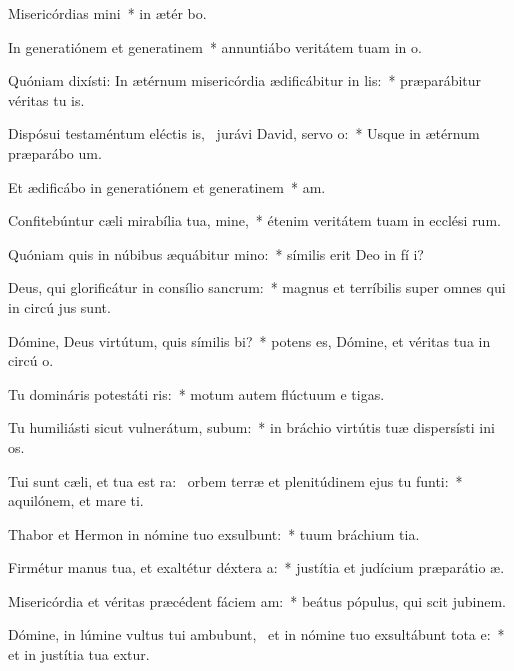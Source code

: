 \item Misericórdias mini~* in ætér bo.
\item In generatiónem et generatinem~* annuntiábo veritátem tuam in  o.
\item Quóniam dixísti: In ætérnum misericórdia ædificábitur in lis:~* præparábitur véritas tu  is.
\item Dispósui testaméntum eléctis is,~\pscross{} jurávi David, servo o:~* Usque in ætérnum præparábo  um.
\item Et ædificábo in generatiónem et generatinem~*  am.
\item Confitebúntur cæli mirabília tua, mine,~* étenim veritátem tuam in ecclési rum.
\item Quóniam quis in núbibus æquábitur mino:~* símilis erit Deo in fí i?
\item Deus, qui glorificátur in consílio sancrum:~* magnus et terríbilis super omnes qui in circú jus sunt.
\item Dómine, Deus virtútum, quis símilis bi?~* potens es, Dómine, et véritas tua in circú o.
\item Tu domináris potestáti ris:~* motum autem flúctuum e  tigas.
\item Tu humiliásti sicut vulnerátum, subum:~* in bráchio virtútis tuæ dispersísti ini os.
\item Tui sunt cæli, et tua est ra:~\pscross{} orbem terræ et plenitúdinem ejus tu funti:~* aquilónem, et mare  ti.
\item Thabor et Hermon in nómine tuo exsulbunt:~* tuum bráchium  tia.
\item Firmétur manus tua, et exaltétur déxtera a:~* justítia et judícium præparátio  æ.
\item Misericórdia et véritas præcédent fáciem am:~* beátus pópulus, qui scit jubinem.
\item Dómine, in lúmine vultus tui ambubunt,~\pscross{} et in nómine tuo exsultábunt tota e:~* et in justítia tua extur.
